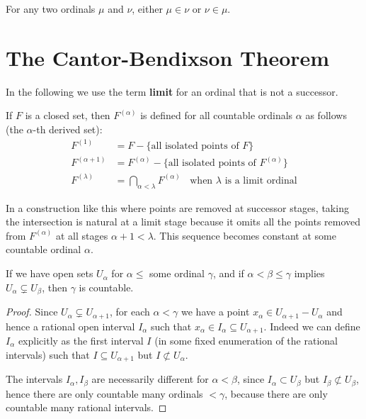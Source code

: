 \documentclass[12pt, a4paper, oneside, openright, titlepage]{book}
\begin{document}
\begin{cor}
    For any two ordinals $\mu$ and $\nu$, either $\mu \in \nu$ or $\nu \in \mu$.
\end{cor}



\section{The Cantor-Bendixson Theorem}

In the following we use the term \textbf{limit} for an ordinal that is not a successor.

\begin{defn}
    If $F$ is a closed set, then $F^{(\alpha)}$ is defined for all countable ordinals $\alpha$ as follows (the $\alpha$-th derived set): \begin{align*}
        F^{(1)} &= F-\{\text{all isolated points of }F\} \\
        F^{(\alpha+1)} &= F^{(\alpha)} - \{\text{all isolated points of }F^{(\alpha)}\} \\
        F^{(\lambda)} &= \bigcap_{\alpha < \lambda}F^{(\alpha)} \;\;\text{ when $\lambda$ is a limit ordinal} 
    \end{align*}
\end{defn}

In a construction like this where points are removed at successor stages, taking the intersection is natural at a limit stage because it omits all the points removed from $F^{(\alpha)}$ at all stages $\alpha+1 < \lambda$. This sequence becomes constant at some countable ordinal $\alpha$.

\begin{lem}
    If we have open sets $U_{\alpha}$ for $\alpha \leq$ some ordinal $\gamma$, and if $\alpha < \beta \leq \gamma$ implies $U_{\alpha} \subsetneq U_{\beta}$, then $\gamma$ is countable.
\end{lem}
\begin{proof}
    Since $U_{\alpha} \subsetneq U_{\alpha+1}$, for each $\alpha < \gamma$ we have a point $x_{\alpha} \in U_{\alpha+1}-U_{\alpha}$ and hence a rational open interval $I_{\alpha}$ such that $x_{\alpha} \in I_{\alpha} \subseteq U_{\alpha+1}$. Indeed we can define $I_{\alpha}$ explicitly as the first interval $I$ (in some fixed enumeration of the rational intervals) such that $I \subseteq U_{\alpha+1}$ but $I \nsubset U_{\alpha}$.

    The intervals $I_{\alpha},I_{\beta}$ are necessarily different for $\alpha < \beta$, since $I_{\alpha} \subset U_{\beta}$ but $I_{\beta} \nsubset U_{\beta}$, hence there are only countable many ordinals $< \gamma$, because there are only countable many rational intervals.
\end{proof}
\end{document}
